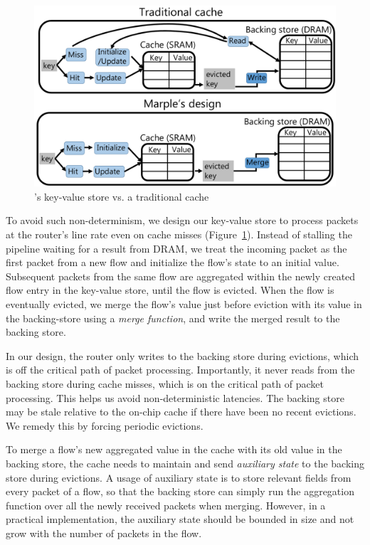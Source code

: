 \begin{figure}
\includegraphics[width=\columnwidth]{pq_kv_store.pdf}
\caption{\TheSystem's key-value store vs. a traditional cache}
\label{fig:kv}
\end{figure}

To avoid such non-determinism, we design our key-value store to process packets
at the router's line rate even on cache misses (Figure~\ref{fig:kv}). Instead
of stalling the pipeline waiting for a result from DRAM, we treat the incoming
packet as the first packet from a new flow and initialize the flow's state to
an initial value.  Subsequent packets from the same flow are aggregated within
the newly created flow entry in the key-value store, until the flow is evicted.
When the flow is eventually evicted, we merge the flow's value just before
eviction with its value in the backing-store using a {\em merge function}, and
write the merged result to the backing store.

In our design, the router only writes to the backing store during evictions,
which is off the critical path of packet processing. Importantly, it never
reads from the backing store during cache misses, which is on the critical path
of packet processing. This helps us avoid non-deterministic latencies.  The
backing store may be stale relative to the on-chip cache if there have been no
recent evictions. We remedy this by forcing periodic evictions.

To merge a flow's new aggregated value in the cache with its old value in the
backing store, the cache needs to maintain and send {\em auxiliary state} to
the backing store during evictions.  A \naive usage of auxiliary state is to
store relevant fields from every packet of a flow, so that the backing store
can simply run the aggregation function over all the newly received packets when
merging.  However, in a practical implementation, the auxiliary state should be
bounded in size and not grow with the number of packets in the flow.

